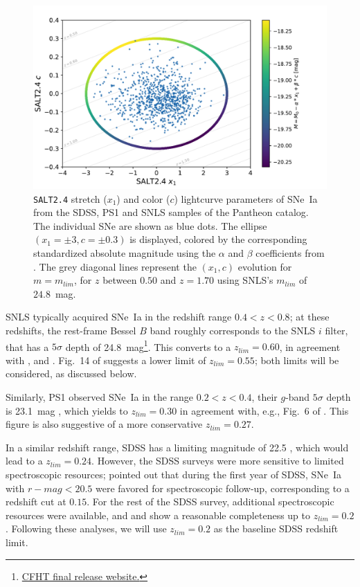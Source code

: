 \documentclass[]{aa} %
\begin{document}
\begin{figure}
    \centering
    \includegraphics[width=0.95\linewidth]{Article_figures/zmax_maglim_snls.pdf}
    \caption{\textsc{\texttt{SALT2.4}} stretch ($x_1$) and color ($c$)
        lightcurve parameters of SNe~Ia from the SDSS, PS1 and SNLS samples of
        the Pantheon catalog. The individual SNe are shown as blue dots. The
        ellipse $(x_1=\pm3, c=\pm0.3)$ is displayed, colored by the
        corresponding standardized absolute magnitude using the $\alpha$ and
        $\beta$ coefficients from \cite{scolnic2018a}. The grey diagonal lines
        represent the $(x_1, c)$ evolution for $m = m_{lim}$, for $z$ between
        $0.50$ and $z=1.70$ using SNLS's $m_{lim}$ of $24.8$~mag.}
    \label{fig:maglim}
\end{figure}

SNLS typically acquired SNe~Ia in the redshift range $0.4<z<0.8$; at these
redshifts, the rest-frame Bessel $B$ band roughly corresponds to the SNLS $i$
filter, that has a $5\sigma$ depth of
24.8~mag\footnote{\href{https://www.cfht.hawaii.edu/Science/CFHTLS/cfhtlsfinalreleaseexecsummary.html}{CFHT
final release website.}}. This converts to a $z_{lim}=0.60$, in agreement with
\cite{neill2006}, \cite{perrett2010} and \cite{bazin2011}. Fig.~14 of
\cite[][see their Section~5]{perrett2010} suggests a lower limit of
$z_{lim}=0.55$; both limits will be considered, as discussed below.

Similarly, PS1 observed SNe~Ia in the range $0.2<z<0.4$, their $g$-band
$5\sigma$ depth is 23.1~mag \citep{rest2014}, which yields to $z_{lim}=0.30$ in
agreement with, e.g., Fig.~6 of \cite{scolnic2018a}. This figure is also
suggestive of a more conservative $z_{lim}=0.27$.

In a similar redshift range, SDSS has a limiting magnitude of 22.5
\citep{dilday2008, sako2008}, which would lead to a $z_{lim}=0.24$. However, the
SDSS surveys were more sensitive to limited spectroscopic resources; \cite[][see
their Section~2]{kessler2009} pointed out that during the first year of SDSS,
SNe~Ia with $r-mag<20.5$ were favored for spectroscopic follow-up, corresponding
to a redshift cut at $0.15$. For the rest of the SDSS survey, additional
spectroscopic resources were available, and \cite{kessler2009} and
\cite{dilday2008} show a reasonable completeness up to $z_{lim}=0.2$. Following
these analyses, we will use $z_{lim}=0.2$ as the baseline SDSS redshift limit.
\end{document}
